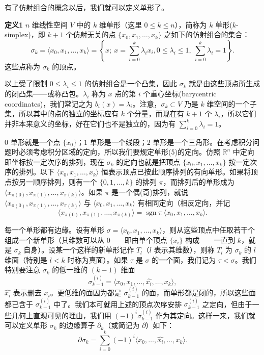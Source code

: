 有了仿射组合的概念以后，我们就可以定义单形了。

\noindent\textbf{定义1}\quad
$n$ 维线性空间 $V$ 中的 $k$ 维单形（这里 $0\le k\le n$），简称为 $k$ 单形($k$-simplex)，即 $k+1$ 个仿射无关的点 $\{x_0,x_1,\ldots,x_k\}$ 之如下的仿射组合的集合：
\begin{equation}
 \sigma_k=\langle x_0,x_1,\ldots,x_k\rangle
 =\left\{x;\ x=\sum_{i=0}^k\lambda_i x_i,
 0\le\lambda_i\le1,\ \sum_{i=0}^k\lambda_i=1\right\}.
 \tag{5}
\end{equation}
这些点称为 $\sigma_k$ 的顶点。

以上受了限制 $0\le\lambda_i\le1$ 的仿射组合是一个凸集，因此 $\sigma_k$ 就是由这些顶点所生成的闭凸集——或称凸包。$\lambda_i$ 称为 $x$ 点的第 $i$ 个重心坐标(barycentric coordinates)，我们常记之为 $b_i(x)=\lambda_i$。注意，$\sigma_k\subset V$ 乃是 $k$ 维空间的一个子集，所以其中的点的独立的坐标应有 $k$ 个分量，而现在有 $k+1$ 个 $\lambda_i$，所以它们并非本来意义的坐标，好在它们也不是独立的，因为有 $\sum_{i=0}^k\lambda_i=1$。

$0$ 单形就是一个点 $\{x_0\}$；$1$ 单形是一个线段；$2$ 单形是一个三角形。在考虑积分问题时必须考虑积分区域的定向，所以我们要规定单形(5)的定向。仿照 $\mathbb R^n$ 中定向即坐标按一定次序的排列，现在 $\sigma_k$ 的定向也就是把顶点 $\{x_0,x_1,\ldots,x_k\}$ 按一定次序的排列。以下 $\langle x_0,x_1,\ldots,x_k\rangle$ 恒表示顶点已按此顺序排列的有向单形。如果将顶点按另一顺序排列，则有一个 $\{0,1,\ldots,k\}$ 的排列 $\pi$，而排列后的单形成为 $\langle x_{\pi(0)},x_{\pi(1)},\ldots,x_{\pi(k)}\rangle$。如果 $\pi$ 是一个偶(奇)排列，就说 $\langle x_{\pi(0)},x_{\pi(1)},\ldots,x_{\pi(k)}\rangle$ 与 $\langle x_0,x_1,\ldots,x_k\rangle$ 有相同定向（相反定向，并记
\[
 \langle x_{\pi(0)},x_{\pi(1)},\ldots,x_{\pi(k)}\rangle
 =\operatorname{sgn}\pi\,\langle x_0,x_1,\ldots,x_k\rangle.
\]

每一个单形都有边缘。设有单形 $\sigma=\langle x_0,x_1,\ldots,x_k\rangle$，则从这些顶点中任取若干个组成一个新单形（其维数可以从 $0$——即由单个顶点 $\{x_i\}$ 构成——一直到 $k$，就是 $\sigma_k$ 自身）。设某一个这样的新单形记作 $T_l$（$l$ 表示其维数），则称 $T_l$ 为 $\sigma_k$ 的 $l$ 维面（特别是 $l<k$ 时称为真面）。如果 $\tau$ 是 $\sigma$ 的一个面，我们记为 $\tau<\sigma$。我们特别要注意 $\sigma_k$ 的低一维的 $(k-1)$ 维面
\[
 \sigma_{k-1}^{(i)}=\langle x_0,x_1,\ldots,\widehat{x_i},\ldots,x_k\rangle,
\]
$\widehat{x_i}$ 表示删去 $x_i$。更低维的面因为都是 $\sigma_{k-1}^{(i)}$ 的面，而单形都是闭的，所以这些面都已含于 $\sigma_{k-1}^{(i)}$ 中了。我们本可就用上述的顶点次序安排 $\sigma_{k-1}^{(i)}$ 之定向，但由于一些几何上直观可见的理由，我们用 $(-1)^i\sigma_{k-1}^{(i)}$ 作为其定向。这样一来，我们就可以定义单形 $\sigma_k$ 的边缘算子 $\partial_k$（或简记为 $\partial$）如下：
\begin{equation}
 \partial\sigma_k
 =\sum_{i=0}^k(-1)^i\langle x_0,\ldots,\widehat{x_i},\ldots,x_k\rangle.
 \tag{6}
\end{equation}

